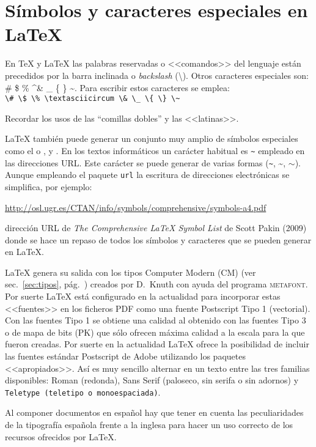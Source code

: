 \documentclass[11pt,a4paper]{article}
\begin{document}
\section[Símbolos]{Símbolos y caracteres especiales en \LaTeX{}}
\label{sec:simb} %

En \TeX{} y \LaTeX{} las palabras reservadas o <<comandos>> del lenguaje están precedidos por la barra inclinada o \emph{backslash} (\textbackslash). Otros caracteres especiales son: \# \$ \% \textasciicircum \& \_ \{ \} \~{}. Para escribir estos caracteres se emplea:\\
\verb!\# \$ \% \textasciicircum \& \_ \{ \} \~!

Recordar los usos de las ``comillas dobles'' y las <<latinas>>.

\LaTeX{} también puede generar un conjunto muy amplio de símbolos especiales como el \EUR{} o \texteuro,  y \Coffeecup. En los textos informáticos un carácter habitual es \verb+~+ empleado en las direcciones URL. Este carácter se puede generar de varias formas (\verb+~+, \~{}, $\sim$). Aunque empleando el paquete \texttt{url} la escritura de direcciones electrónicas se simplifica, por ejemplo:

{\url{http://osl.ugr.es/CTAN/info/symbols/comprehensive/symbols-a4.pdf}}

\noindent dirección URL de \emph{The Comprehensive \LaTeX{} Symbol List} de Scott Pakin (2009) donde se hace un repaso de todos los símbolos y caracteres que se pueden generar en \LaTeX{}.

\LaTeX{} genera su salida con los tipos Computer Modern (CM) (ver sec.~\ref{sec:tipos}, pág.~\pageref{sec:tipos}) creados por D.~Knuth con ayuda del programa \textsc{metafont}. Por suerte \LaTeX{} está configurado en la actualidad para incorporar estas <<fuentes>> en los ficheros PDF como una fuente Postscript Tipo 1 (vectorial). Con las fuentes Tipo 1 se obtiene una calidad al obtenido con las fuentes Tipo 3 o de mapa de bits (PK) que sólo ofrecen máxima calidad a la escala para la que fueron creadas. Por suerte en la actualidad \LaTeX{} ofrece la posibilidad de incluir las fuentes estándar Postscript de Adobe utilizando los paquetes <<apropiados>>. Así es muy sencillo alternar en un texto entre las tres familias disponibles: Roman (redonda), \textsf{Sans Serif (paloseco, sin serifa o sin adornos)} y \texttt{Teletype (teletipo o monoespaciada)}. 

Al componer documentos en español hay que tener en cuenta las peculiaridades de la tipografía española frente a la inglesa para hacer un uso correcto de los recursos ofrecidos por \LaTeX.
\end{document}
